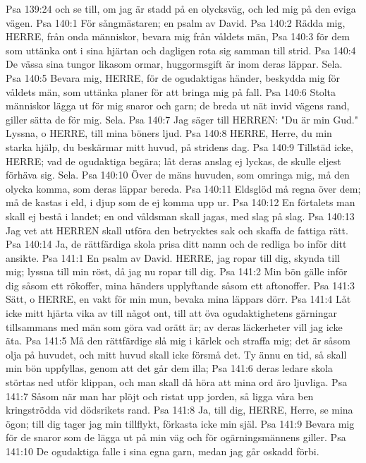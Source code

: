 Psa 139:24  och se till, om jag är stadd på en olycksväg, och led mig på den eviga vägen.
Psa 140:1  För sångmästaren; en psalm av David.
Psa 140:2  Rädda mig, HERRE, från onda människor, bevara mig från våldets män,
Psa 140:3  för dem som uttänka ont i sina hjärtan och dagligen rota sig samman till strid.
Psa 140:4  De vässa sina tungor likasom ormar, huggormsgift är inom deras läppar. Sela.
Psa 140:5  Bevara mig, HERRE, för de ogudaktigas händer, beskydda mig för våldets män, som uttänka planer för att bringa mig på fall.
Psa 140:6  Stolta människor lägga ut för mig snaror och garn; de breda ut nät invid vägens rand, giller sätta de för mig. Sela.
Psa 140:7  Jag säger till HERREN: "Du är min Gud." Lyssna, o HERRE, till mina böners ljud.
Psa 140:8  HERRE, Herre, du min starka hjälp, du beskärmar mitt huvud, på stridens dag.
Psa 140:9  Tillstäd icke, HERRE; vad de ogudaktiga begära; låt deras anslag ej lyckas, de skulle eljest förhäva sig. Sela.
Psa 140:10  Över de mäns huvuden, som omringa mig, må den olycka komma, som deras läppar bereda.
Psa 140:11  Eldsglöd må regna över dem; må de kastas i eld, i djup som de ej komma upp ur.
Psa 140:12  En förtalets man skall ej bestå i landet; en ond våldsman skall jagas, med slag på slag.
Psa 140:13  Jag vet att HERREN skall utföra den betrycktes sak och skaffa de fattiga rätt.
Psa 140:14  Ja, de rättfärdiga skola prisa ditt namn och de redliga bo inför ditt ansikte.
Psa 141:1  En psalm av David. HERRE, jag ropar till dig, skynda till mig; lyssna till min röst, då jag nu ropar till dig.
Psa 141:2  Min bön gälle inför dig såsom ett rökoffer, mina händers upplyftande såsom ett aftonoffer.
Psa 141:3  Sätt, o HERRE, en vakt för min mun, bevaka mina läppars dörr.
Psa 141:4  Låt icke mitt hjärta vika av till något ont, till att öva ogudaktighetens gärningar tillsammans med män som göra vad orätt är; av deras läckerheter vill jag icke äta.
Psa 141:5  Må den rättfärdige slå mig i kärlek och straffa mig; det är såsom olja på huvudet, och mitt huvud skall icke försmå det. Ty ännu en tid, så skall min bön uppfyllas, genom att det går dem illa;
Psa 141:6  deras ledare skola störtas ned utför klippan, och man skall då höra att mina ord äro ljuvliga.
Psa 141:7  Såsom när man har plöjt och ristat upp jorden, så ligga våra ben kringströdda vid dödsrikets rand.
Psa 141:8  Ja, till dig, HERRE, Herre, se mina ögon; till dig tager jag min tillflykt, förkasta icke min själ.
Psa 141:9  Bevara mig för de snaror som de lägga ut på min väg och för ogärningsmännens giller.
Psa 141:10  De ogudaktiga falle i sina egna garn, medan jag går oskadd förbi.
